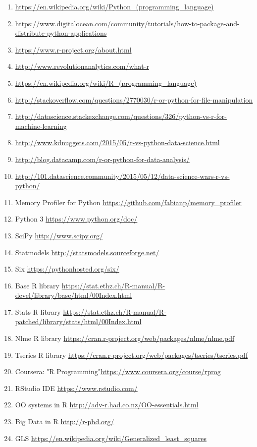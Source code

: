 \documentclass [twoside,
  11pt, a4paper,
  footinclude=true,
  headinclude=true,
  cleardoublepage=empty
]{article}
\begin{document}
\begin{enumerate}
    \item \url{https://en.wikipedia.org/wiki/Python_(programming_language)}
    \item \url{https://www.digitalocean.com/community/tutorials/how-to-package-and-distribute-python-applications}
    \item \url{https://www.r-project.org/about.html}
    \item \url{http://www.revolutionanalytics.com/what-r}
    \item \url{https://en.wikipedia.org/wiki/R_(programming_language)}
    \item \url{http://stackoverflow.com/questions/2770030/r-or-python-for-file-manipulation}
    \item \url{http://datascience.stackexchange.com/questions/326/python-vs-r-for-machine-learning}
    \item \url{http://www.kdnuggets.com/2015/05/r-vs-python-data-science.html}
    \item \url{http://blog.datacamp.com/r-or-python-for-data-analysis/}
    \item \url{http://101.datascience.community/2015/05/12/data-science-wars-r-vs-python/}
    \item Memory Profiler for Python \url{https://github.com/fabianp/memory_profiler} 
    \item Python 3 \url{https://www.python.org/doc/}
    \item SciPy \url{http://www.scipy.org/}
    \item Statmodels \url{http://statsmodels.sourceforge.net/}
    \item Six \url{https://pythonhosted.org/six/}
    \item Base R library \url{https://stat.ethz.ch/R-manual/R-devel/library/base/html/00Index.html}
    \item Stats R library \url{https://stat.ethz.ch/R-manual/R-patched/library/stats/html/00Index.html}
    \item Nlme R library \url{https://cran.r-project.org/web/packages/nlme/nlme.pdf}
    \item Tseries R library \url{https://cran.r-project.org/web/packages/tseries/tseries.pdf}
    \item Coursera: "R Programming"\url{https://www.coursera.org/course/rprog}
    \item RStudio IDE \url{https://www.rstudio.com/}
    \item OO systems in R \url{http://adv-r.had.co.nz/OO-essentials.html}
    \item Big Data in R \url{http://r-pbd.org/}
    \item GLS \url{https://en.wikipedia.org/wiki/Generalized_least_squares}
\end{enumerate}
\end{document}
